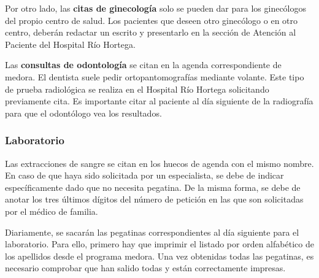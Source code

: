 Por otro lado, las \textbf{citas de ginecología} solo se pueden dar para los ginecólogos del propio centro de salud.
Los pacientes que deseen otro ginecólogo o en otro centro, deberán redactar un escrito y presentarlo en la sección de Atención al Paciente del Hospital Río Hortega.

Las \textbf{consultas de odontología} se citan en la agenda correspondiente de \Gls{medora}.
El dentista suele pedir \gls{ortopantomografías} mediante \gls{volante}.
Este tipo de prueba radiológica se realiza en el Hospital Río Hortega solicitando previamente cita.
Es importante citar al paciente al día siguiente de la radiografía para que el odontólogo vea los resultados.

\subsubsection{Laboratorio}

Las extracciones de sangre se citan en los huecos de agenda con el mismo nombre.
En caso de que haya sido solicitada por un especialista, se debe de indicar específicamente dado que no necesita pegatina.
De la misma forma, se debe de anotar los tres últimos dígitos del número de petición en las que son solicitadas por el médico de familia.

Diariamente, se sacarán las pegatinas correspondientes al día siguiente para el laboratorio.
Para ello, primero hay que imprimir el listado por orden alfabético de los apellidos desde el programa \Gls{medora}.
Una vez obtenidas todas las pegatinas, es necesario comprobar que han salido todas y están correctamente impresas.





